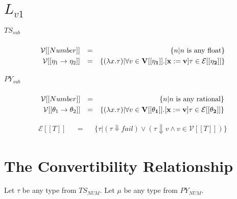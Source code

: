 \documentclass{article}
\begin{document}
	\section{$L_{v1}$}
	
	\subparagraph{$TS_{sub}$}
	\begin{align*}
		\mathcal{V}[[Number]]				&& = && \{ n| n \text{ is any float}\}\\
		\mathcal{V}[[\eta_1 \rightarrow \eta_2]]	&& = && \{ 
				(\lambda x.\tau)| 
				\forall v \in \bf{V}[[\eta_1]].[x:=v]\tau \in \mathcal{E}[[\eta_2]]
		\}
	\end{align*}
	
	\subparagraph{$PY_{sub}$}
	\begin{align*}
		\mathcal{V}[[Number]]				&& = && \{ n| n \text{ is any rational}\}\\
		\mathcal{V}[[\theta_1 \rightarrow \theta_2]]	&& = && \{ 
		(\lambda x.\tau)| 
		\forall v \in \bf{V}[[\theta_1]].[x:=v]\tau \in \mathcal{E}[[\theta_2]]
		\}
	\end{align*}
	
	\begin{align*}
		\mathcal{E}[[T]] && = && \{
		\tau | (\tau \Downarrow fail) \lor
		(\tau \Downarrow v \land v \in \mathcal{V}[[T]])
	\}
	\end{align*}
	
	\section{The Convertibility Relationship}
	
	Let $\tau$ be any type from $TS_{NUM}$. Let $\mu$ be any type from $PY_{NUM}$.
	
	\printbibliography[heading=bibintoc]
\end{document}
